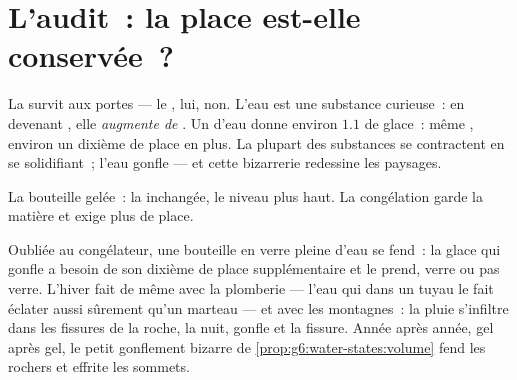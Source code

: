 \section{L'audit~: la place est-elle conservée~?}

\begin{proposition}\label{prop:g6:water-states:volume}
La  survit aux portes --- le , lui, non. L'eau est une
substance curieuse~: en devenant , elle \emph{augmente de
}. Un  d'eau donne environ $1.1$  de glace~: même
, environ un dixième de place en plus. La plupart des substances
se contractent en se solidifiant~; l'eau gonfle --- et cette bizarrerie
redessine les paysages.
\end{proposition}

\begin{omfigure}

{\small La bouteille gelée~: la  inchangée, le niveau plus
haut. La congélation garde la matière et exige plus de place.}
\end{omfigure}

\begin{example}\label{ex:g6:water-states:burst}
Oubliée au congélateur, une bouteille en verre pleine d'eau se
fend~: la glace qui gonfle a besoin de son dixième de place
supplémentaire et le prend, verre ou pas verre. L'hiver fait de même
avec la plomberie --- l'eau qui  dans un tuyau le fait éclater
aussi sûrement qu'un marteau --- et avec les montagnes~: la pluie
s'infiltre dans les fissures de la roche,  la nuit, gonfle et
 la fissure. Année après année, gel après gel, le petit
gonflement bizarre de \cref{prop:g6:water-states:volume} fend les
rochers et effrite les sommets.
\end{example}

